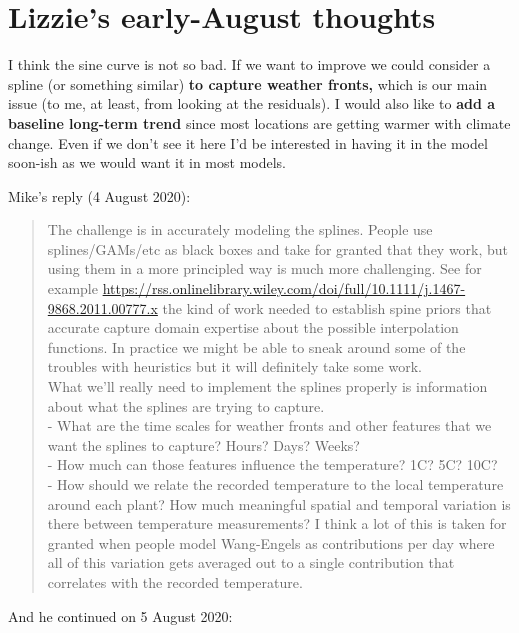 \documentclass[11pt,letter]{article}
\begin{document}


\section{Lizzie's early-August thoughts}

I think the sine curve is not so bad. If we want to improve we could consider a spline (or something similar) {\bf to capture weather fronts,} which is our main issue (to me, at least, from looking at the residuals). I would also like to {\bf add a baseline long-term trend} since most locations are getting warmer with climate change. Even if we don't see it here I'd be interested in having it in the model soon-ish as we would want it in most models. 

Mike's reply (4 August 2020):

\begin{quote}
The challenge is in accurately modeling the splines.  People use splines/GAMs/etc as black boxes and take for granted that they work, but using them in a more principled way is much more challenging.  See for example \url{https://rss.onlinelibrary.wiley.com/doi/full/10.1111/j.1467-9868.2011.00777.x} the kind of work needed to establish spine priors that accurate capture domain expertise about the possible interpolation functions.  In practice we might be able to sneak around some of the troubles with heuristics but it will definitely take some work.\\

What we'll really need to implement the splines properly is information about what the splines are trying to capture. \\
- What are the time scales for weather fronts and other features that we want the splines to capture? Hours?  Days?  Weeks?\\
- How much can those features influence the temperature?  1C?  5C?  10C?\\
- How should we relate the recorded temperature to the local temperature around each plant?  How much meaningful spatial and temporal variation is there between temperature measurements?  I think a lot of this is taken for granted when people model Wang-Engels as contributions per day where all of this variation gets averaged out to a single contribution that correlates with the recorded temperature.
\end{quote}

And he continued on 5 August 2020:
\end{document}
